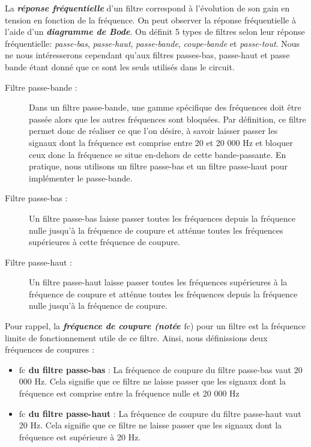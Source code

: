 \documentclass[10pt, oneside, a4paper]{article}
\begin{document}
La \textbf{\textit{réponse fréquentielle}} d'un filtre correspond à l'évolution de son gain en tension en fonction de la fréquence. On peut observer la réponse fréquentielle à l'aide d'un \textbf{\textit{diagramme de Bode}}.
On définit 5 types de filtres selon leur réponse fréquentielle: \textit{passe-bas}, \textit{passe-haut}, \textit{passe-bande}, \textit{coupe-bande} et \textit{passe-tout}. Nous ne nous intéresserons cependant qu'aux filtres passes-bas, passe-haut et passe bande étant donné que ce sont les seuls utilisés dans le circuit.
\begin{description}
\item[Filtre passe-bande :] Dans un filtre passe-bande, une gamme spécifique des fréquences doit être passée alors que les autres fréquences sont bloquées. Par définition, ce filtre permet donc de réaliser ce que l'on désire, à savoir laisser passer les signaux dont la fréquence est comprise entre 20 et 20 000 Hz et bloquer ceux donc la fréquence se situe en-dehors de cette bande-passante. En pratique, nous utilisons un filtre passe-bas et un filtre passe-haut pour implémenter le passe-bande.
\item[Filtre passe-bas :] Un filtre passe-bas laisse passer toutes les fréquences depuis la fréquence nulle jusqu'à la fréquence de coupure et atténue toutes les fréquences supérieures à cette fréquence de coupure.
\item[Filtre passe-haut :] Un filtre passe-haut laisse passer toutes les fréquences supérieures à la fréquence de coupure et atténue toutes les fréquences depuis la fréquence nulle jusqu'à la fréquence de coupure.
\end{description}

Pour rappel, la \textbf{\textit{fréquence de coupure (notée $\text{fc}$}}) pour un filtre est la fréquence limite de fonctionnement utile de ce filtre. Ainsi, nous définissions deux fréquences de coupures : 
\begin{itemize}
\item \textbf{\textit{$\text{fc}$} du filtre passe-bas} : La fréquence de coupure du filtre passe-bas vaut 20 000 Hz. Cela signifie que ce filtre ne laisse passer que les signaux dont la fréquence est comprise entre la fréquence nulle et 20 000 Hz
\item \textbf{\textit{$\text{fc}$} du filtre passe-haut} : La fréquence de coupure du filtre passe-haut vaut 20 Hz. Cela signifie que ce filtre ne laisse passer que les signaux dont la fréquence est supérieure à 20 Hz.
\end{itemize}
\end{document}
